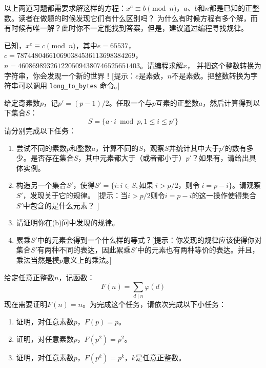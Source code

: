 \begin{problemset}
  \item 以上两道习题都需要求解这样的方程：$x^a \equiv b \pmod{n}$，$a$、$b$和$n$都是已知的正整数。读者在做题的时候发现它们有什么区别吗？
  为什么有时候方程有多个解，而有时候有唯一解？此时你不一定能找到答案，但是，建议通过编程寻找规律。

  \item 已知，$x^e \equiv c \pmod{n}$，其中$e = 65537$，$c = 787448046610690384536113698384269$，$n = 4608698932612205094380746525651403$。请编程求解$x$，
  并把这个整数转换为字符串，你会发现一个新的世界！[提示：$e$是素数，$n$不是素数。把整数转换为字符串可以调用 \lstinline{long_to_bytes} 命令。]

  \item 给定奇素数$p$，记$p' = (p-1)/2$。任取一个与$p$互素的正整数$a$，然后计算得到以下集合$S$：
  \[S = \{  a \cdot i \bmod p, 1 \leq i \leq p' \}\]
  请分别完成以下任务：
   \begin{enumerate}
   \item 尝试不同的素数$p$和整数$a$，计算不同的$S$，观察$S$并统计其中大于$p'$的数有多少。是否存在集合$S$，其中元素都大于（或者都小于）$p'$？如果有，请给出具体实例。

   \item 构造另一个集合$S'$，使得$S'= \{ i:  i \in S, \text{如果}\; i > p/2 \text{，则令}\; i = p - i \}$。请观察$S'$，发现关于它的规律。
   [提示：当$i > p/2$则令$i = p - i$的这一操作使得集合$S'$中包含的是什么元素？ ]

   \item 请证明你在(b)问中发现的规律。

   \item 累乘$S'$中的元素会得到一个什么样的等式？[提示：你发现的规律应该使得你对集合$S'$有两种不同的表达，因此累乘$S'$中的元素也有两种等价的表达。并且，
   乘法当然是模$p$意义上的乘法。]

    \end{enumerate}

  \item 给定任意正整数$n$，记函数：
  \[F(n) = \sum_{d \mid n} \varphi(d) \]
  现在需要证明$F(n) = n$。为完成这个任务，请依次完成以下小任务：
  \begin{enumerate}
  \item 证明，对任意素数$p$，$F(p) = p$。

  \item 证明，对任意素数$p$，$F(p^2) = p^2$。

  \item 证明，对任意素数$p$，$F(p^k) = p^k$，$k$是任意正整数。


\end{enumerate}
\end{problemset}

